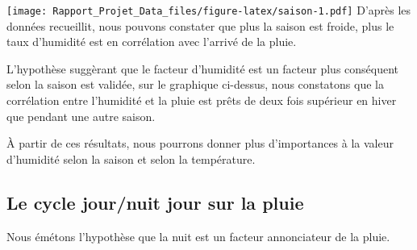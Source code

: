 \documentclass[
]{article}
\begin{document}
\texttt{[image: Rapport\_Projet\_Data\_files/figure-latex/saison-1.pdf]}
D'après les données recueillit, nous pouvons constater que plus la
saison est froide, plus le taux d'humidité est en corrélation avec
l'arrivé de la pluie.

L'hypothèse suggèrant que le facteur d'humidité est un facteur plus
conséquent selon la saison est validée, sur le graphique ci-dessus, nous
constatons que la corrélation entre l'humidité et la pluie est prêts de
deux fois supérieur en hiver que pendant une autre saison.

À partir de ces résultats, nous pourrons donner plus d'importances à la
valeur d'humidité selon la saison et selon la température.

\hypertarget{le-cycle-journuit-jour-sur-la-pluie}{%
\subsection{Le cycle jour/nuit jour sur la
pluie}\label{le-cycle-journuit-jour-sur-la-pluie}}

Nous émétons l'hypothèse que la nuit est un facteur annonciateur de la
pluie.
\end{document}
